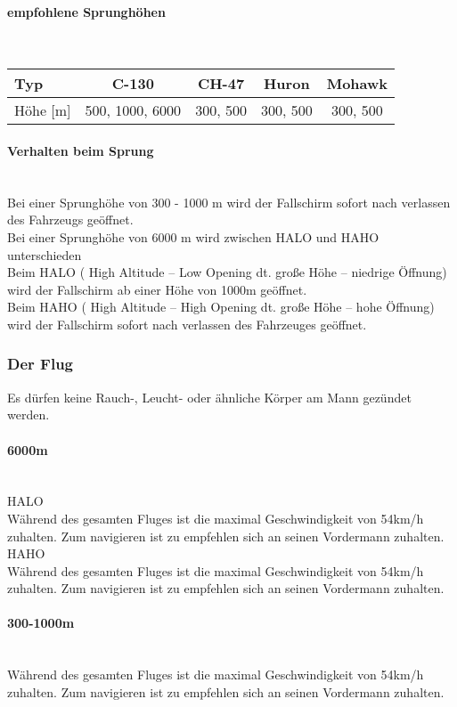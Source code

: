 \paragraph{empfohlene Sprunghöhen} \ \\
\begin{longtable}{|l|c|c|c|c|} \hline
	Typ 			&		C-130 	&	CH-47 	&	Huron		&		 Mohawk	\\ \hline
	Höhe	[m]		&		500, 1000, 6000 & 300, 500	&	300, 500	&		300, 500	\\ \hline
\end{longtable}

\paragraph{Verhalten beim Sprung} \ \\
	Bei einer Sprunghöhe von 300 - 1000 m wird der Fallschirm sofort nach verlassen des Fahrzeugs geöffnet. \\
	Bei einer Sprunghöhe von 6000 m wird zwischen HALO und HAHO unterschieden \\
	Beim HALO ( High Altitude – Low Opening dt. große Höhe – niedrige Öffnung) wird der Fallschirm ab einer Höhe von 1000m geöffnet. \\
	Beim HAHO ( High Altitude – High Opening dt. große Höhe – hohe Öffnung) wird der Fallschirm sofort nach verlassen des Fahrzeuges geöffnet. \\

\subsubsection{Der Flug}
Es dürfen keine Rauch-, Leucht- oder ähnliche Körper am Mann gezündet werden. \\
\paragraph{6000m} \ \\
	HALO	\\
	Während des gesamten Fluges ist die maximal Geschwindigkeit von 54km/h zuhalten. Zum navigieren ist zu empfehlen sich an seinen Vordermann zuhalten. \\
	HAHO \\
	Während des gesamten Fluges ist die maximal Geschwindigkeit von 54km/h zuhalten. Zum navigieren ist zu empfehlen sich an seinen Vordermann zuhalten. \\

\paragraph{300-1000m} \ \\
	Während des gesamten Fluges ist die maximal Geschwindigkeit von 54km/h zuhalten. Zum navigieren ist zu empfehlen sich an seinen Vordermann zuhalten. \\

